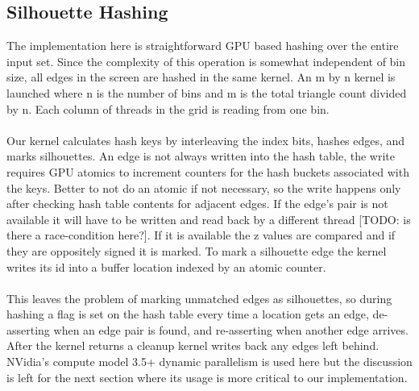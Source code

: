 \documentclass[review]{acmsiggraph}
\begin{document}
\subsection{Silhouette Hashing}
The implementation here is straightforward GPU based hashing over the entire input set. Since the complexity of this operation is somewhat independent of bin size, all edges in the screen are hashed in the same kernel. An m by n kernel is launched where n is the number of bins and m is the total triangle count divided by n. Each column of threads in the grid is reading from one bin.
\\\\
Our kernel calculates hash keys by interleaving the index bits, hashes edges, and marks silhouettes. An edge is not always written into the hash table, the write requires GPU atomics to increment counters for the hash buckets associated with the keys. Better to not do an atomic if not necessary, so the write happens only after checking hash table contents for adjacent edges. If the edge’s pair is not available it will have to be written and read back by a different thread [TODO: is there a race-condition here?]. If it is available the z values are compared and if they are oppositely signed it is marked. To mark a silhouette edge the kernel writes its id into a buffer location indexed by an atomic counter. 
\\\\
This leaves the problem of marking unmatched edges as silhouettes, so during hashing a flag is set on the hash table every time a location gets an edge, de-asserting when an edge pair is found, and re-asserting when another edge arrives. After the kernel returns a cleanup kernel writes back any edges left behind. NVidia’s compute model 3.5+ dynamic parallelism is used here but the discussion is left for the next section where its usage is more critical to our implementation.
\end{document}
